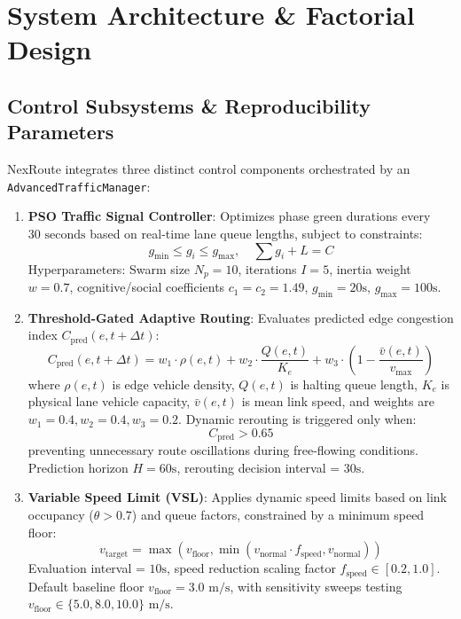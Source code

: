 \documentclass[3p,times,procedia]{elsarticle}
\begin{document}
\section{System Architecture \& Factorial Design}
\label{sec:architecture}

\subsection{Control Subsystems \& Reproducibility Parameters}
NexRoute integrates three distinct control components orchestrated by an \texttt{AdvancedTrafficManager}:

\begin{enumerate}
    \item \textbf{PSO Traffic Signal Controller}: Optimizes phase green durations every $30\text{ seconds}$ based on real-time lane queue lengths, subject to constraints:
    \begin{equation}
    g_{\min} \le g_i \le g_{\max}, \quad \sum g_i + L = C
    \end{equation}
    Hyperparameters: Swarm size $N_p = 10$, iterations $I = 5$, inertia weight $w = 0.7$, cognitive/social coefficients $c_1 = c_2 = 1.49$, $g_{\min} = 20\text{s}$, $g_{\max} = 100\text{s}$.
    
    \item \textbf{Threshold-Gated Adaptive Routing}: Evaluates predicted edge congestion index $C_{\text{pred}}(e, t + \Delta t)$:
    \begin{equation}
    C_{\text{pred}}(e, t + \Delta t) = w_1 \cdot \rho(e, t) + w_2 \cdot \frac{Q(e, t)}{K_e} + w_3 \cdot \left(1 - \frac{\bar{v}(e, t)}{v_{\text{max}}}\right)
    \end{equation}
    where $\rho(e, t)$ is edge vehicle density, $Q(e, t)$ is halting queue length, $K_e$ is physical lane vehicle capacity, $\bar{v}(e, t)$ is mean link speed, and weights are $w_1 = 0.4, w_2 = 0.4, w_3 = 0.2$. Dynamic rerouting is triggered only when:
    \begin{equation}
    C_{\text{pred}} > 0.65
    \end{equation}
    preventing unnecessary route oscillations during free-flowing conditions. Prediction horizon $H = 60\text{s}$, rerouting decision interval = $30\text{s}$.
    
    \item \textbf{Variable Speed Limit (VSL)}: Applies dynamic speed limits based on link occupancy ($\theta > 0.7$) and queue factors, constrained by a minimum speed floor:
    \begin{equation}
    v_{\text{target}} = \max\left(v_{\text{floor}}, \min\left(v_{\text{normal}} \cdot f_{\text{speed}}, v_{\text{normal}}\right)\right)
    \end{equation}
    Evaluation interval = $10\text{s}$, speed reduction scaling factor $f_{\text{speed}} \in [0.2, 1.0]$. Default baseline floor $v_{\text{floor}} = 3.0\text{ m/s}$, with sensitivity sweeps testing $v_{\text{floor}} \in \{5.0, 8.0, 10.0\}\text{ m/s}$.
\end{enumerate}
\end{document}
